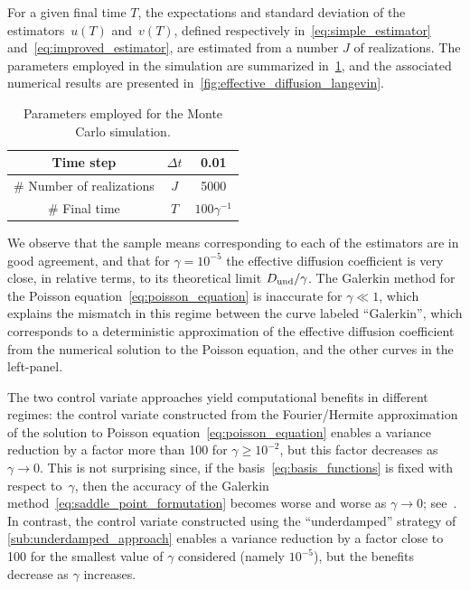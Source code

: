 \documentclass[11pt,a4paper]{article}
\begin{document}
For a given final time $T$,
the expectations and standard deviation of the estimators~$u(T)$ and~$v(T)$,
defined respectively in~\eqref{eq:simple_estimator} and~\eqref{eq:improved_estimator},
are estimated from a number $J$ of realizations.
The parameters employed in the simulation are summarized in~\cref{table:parameters_employed_for_mc},
and the associated numerical results are presented in~\cref{fig:effective_diffusion_langevin}.
\begin{table}[ht]
    \centering
    \begin{tabular}{|c|c|c|}
        \hline
        Time step & $\Delta t$ & 0.01 \\
        \hline
        \# Number of realizations & $J$ & 5000 \\
        \hline
        \# Final time & $T$ & $100 \gamma^{-1}$ \\
        \hline
    \end{tabular}
    \caption{Parameters employed for the Monte Carlo simulation.}
    \label{table:parameters_employed_for_mc}
\end{table}
We observe that the sample means corresponding to each of the estimators are in good agreement,
and that for $\gamma = 10^{-5}$ the effective diffusion coefficient is very close, in relative terms,
to its theoretical limit $D_{\rm und}/\gamma$.
The Galerkin method for the Poisson equation~\eqref{eq:poisson_equation} is inaccurate for $\gamma \ll 1$,
which explains the mismatch in this regime between the curve labeled ``Galerkin'',
which corresponds to a deterministic approximation of the effective diffusion coefficient from the numerical solution to the Poisson equation,
and the other curves in the left-panel.

The two control variate approaches yield computational benefits in different regimes:
the control variate constructed from the Fourier/Hermite approximation of the solution to Poisson equation~\eqref{eq:poisson_equation}
enables a variance reduction by a factor more than 100 for $\gamma \geq 10^{-2}$,
but this factor decreases as $\gamma \to 0$.
This is not surprising since,
if the basis~\eqref{eq:basis_functions} is fixed with respect to~$\gamma$,
then the accuracy of the Galerkin method~\eqref{eq:saddle_point_formutation} becomes worse and worse as $\gamma \to 0$;
see~\cite{roussel2018spectral}.
In contrast, the control variate constructed using the ``underdamped'' strategy of \cref{sub:underdamped_approach} enables a variance reduction by a factor close to 100 for the smallest value of $\gamma$ considered (namely $10^{-5}$),
but the benefits decrease as $\gamma$ increases.
\end{document}

